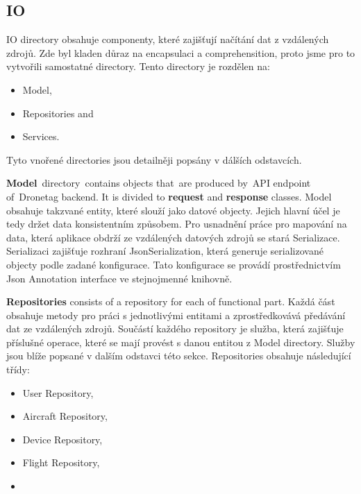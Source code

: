 \subsection{IO}\label{subsec:io}
IO directory obsahuje componenty, které zajišťují načítání dat z vzdálených zdrojů.
Zde byl kladen důraz na encapsulaci a comprehensition, proto jsme pro to vytvořili samostatné directory.
Tento directory je rozdělen na:
\begin{itemize}
    \item Model,
    \item Repositories and
    \item Services.
\end{itemize}
Tyto vnořené directories jsou detailněji popsány v dálších odstavcích.

\textbf{Model}~directory~contains objects that~are produced by~API endpoint of~Dronetag backend.
It is divided to \textbf{request} and \textbf{response} classes.
Model obsahuje takzvané entity, které slouží jako datové objecty.
Jejich hlavní účel je tedy držet data konsistentním způsobem.
Pro usnadnění práce pro mapování na data, která aplikace obdrží ze vzdálených datových zdrojů se stará Serializace.
Serializaci zajišťuje rozhraní JsonSerialization, která generuje serializované objecty podle zadané konfigurace.
Tato konfigurace se provádí prostřednictvím Json Annotation interface ve stejnojmenné knihovně.

\textbf{Repositories} consists of a repository for each of functional part.
Každá část obsahuje metody pro práci s jednotlivými entitami a zprostředkovává předávání dat ze vzdálených zdrojů.
Součástí každého repository je služba, která zajišťuje příslušné operace, které se mají provést s danou entitou z Model directory.
Služby jsou blíže popsané v dalším odstavci této sekce.
Repositories obsahuje následující třídy:
\begin{itemize}
    \item User Repository,
    \item Aircraft Repository,
    \item Device Repository,
    \item Flight Repository,
    \item
\end{itemize}

